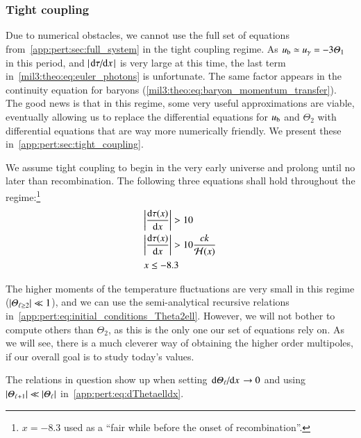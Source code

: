 \subsubsection{Tight coupling}
    Due to numerical obstacles, we cannot use the full set of equations from~\cref{app:pert:sec:full_system} in the tight coupling regime. As $u_\mathrm{b}\simeq u_\gamma = -3\varTheta_1$ in this period, and $\abs{\dv*{\tau}{x}}$ is very large at this time, the last term in~\cref{mil3:theo:eq:euler_photons} is unfortunate. The same factor appears in the continuity equation for baryons (\cref{mil3:theo:eq:baryon_momentum_transfer}). The good news is that in this regime, some very useful approximations are viable, eventually allowing us to replace the differential equations for $u_\mathrm{b}$ and $\Theta_2$ with differential equations that are way more numerically friendly. We present these in~\cref{app:pert:sec:tight_coupling}.

    We assume tight coupling to begin in the very early universe and prolong until no later than recombination. The following three equations shall hold throughout the regime:\footnote{$x=-8.3$ used as a ``fair while before the onset of recombination''.}
    \begin{subequations}\label{mil3:theo:eq:tc_conditions}
    \begin{align}
        &\abs{\dv{\tau(x)}{x}} > 10 \label{mil3:theo:eq:tc_condition_one} \\
        & \abs{\dv{\tau(x)}{x}} > 10 \frac{ck}{\mathcal{H}(x)} \label{mil3:theo:eq:tc_condition_two}\\
        &x \leq -8.3 \label{mil3:theo:eq:tc_condition_three}
    \end{align}
    \end{subequations}

    The higher moments of the temperature fluctuations are very small in this regime ($\abs{\varTheta_{\ell\geq 2}}\ll 1$), and we can use the semi-analytical recursive relations in~\cref{app:pert:eq:initial_conditions_Theta2ell}. However, we will not bother to compute others than $\Theta_2$, as this is the only one our set of equations rely on. As we will see, there is a much cleverer way of obtaining the higher order multipoles, if our overall goal is to study today's values.

    The relations in question show up when setting $\dv*{\varTheta_\ell}{x}\to 0$ and using $\abs{\varTheta_{\ell+1}} \ll \abs{\varTheta_\ell}$ in~\cref{app:pert:eq:dThetaelldx}.


